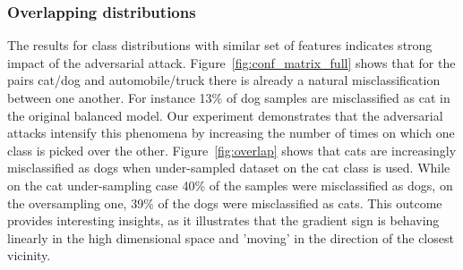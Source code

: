 \documentclass[runningheads,a4paper]{llncs}
\begin{document}
\subsubsection{Overlapping distributions} The results for class distributions with similar set of features indicates strong impact of the adversarial attack. Figure~\ref{fig:conf_matrix_full} shows that for the pairs cat/dog and automobile/truck there is already a natural misclassification between one another. For instance 13\% of dog samples are misclassified as cat in the original balanced model. Our experiment demonstrates that the adversarial attacks intensify this phenomena by increasing the number of times on which one class is picked over the other. Figure~\ref{fig:overlap} shows that cats are increasingly misclassified as dogs when under-sampled dataset on the cat class is used. While on the cat under-sampling case 40\% of the samples were misclassified as dogs, on the oversampling one, 39\% of the dogs were misclassified as cats. This outcome provides interesting insights, as it illustrates that the gradient sign is behaving linearly in the high dimensional space and 'moving' in the direction of the closest vicinity.
\end{document}
